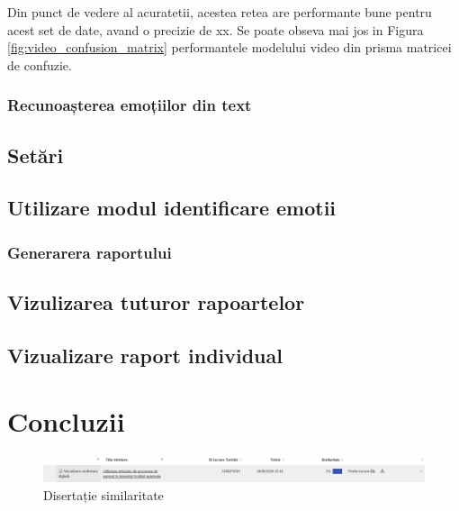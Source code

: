 \documentclass[a4paper, 12pt]{report}
\begin{document}
	Din punct de vedere al acuratetii, acestea retea are performante bune pentru acest set de date, avand o precizie de xx. Se poate obseva mai jos in Figura \ref{fig:video_confusion_matrix} performantele modelului video din prisma matricei de confuzie.
	
	\clearpage
	\subsubsection{Recunoașterea emoțiilor din text}
	
	
	\clearpage
	\subsection{Setări}
	
	\clearpage
	\subsection{Utilizare modul identificare emotii}
	
	\clearpage
	\subsubsection{Generarera raportului}
	
	\clearpage
	\subsection{Vizulizarea tuturor rapoartelor}
	
	\clearpage
	\subsection{Vizualizare raport individual}
	
	\clearpage
	\section{Concluzii}
	
	\clearpage
    \printbibliography
    \clearpage
	\begin{figure}[H]
		\begin{center}
			\includegraphics[scale=0.4]{images/plagiat.PNG}
		\end{center}
		\caption{Disertație similaritate}
		\label{fig:sim}
	\end{figure} 	
\end{document}
